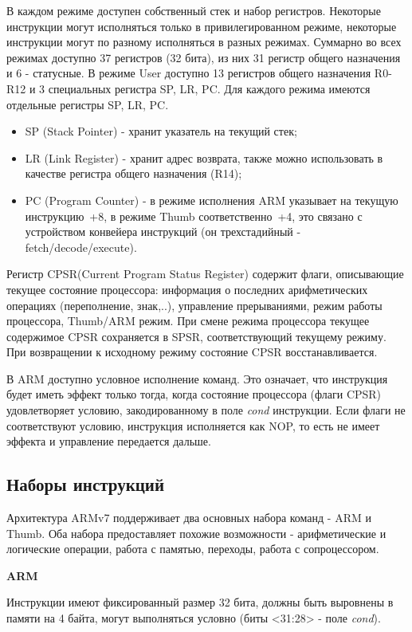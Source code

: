 В каждом режиме доступен собственный стек и набор регистров. Некоторые инструкции могут исполняться только в привилегированном режиме, некоторые инструкции могут по разному исполняться в разных режимах. Суммарно во всех режимах доступно 37 регистров (32 бита), из них 31 регистр общего назначения и 6 - статусные. В режиме User доступно 13 регистров общего назначения R0-R12 и 3 специальных регистра SP, LR, PC. Для каждого режима имеются отдельные регистры SP, LR, PC.

\begin{itemize}
    \item SP (Stack Pointer) - хранит указатель на текущий стек;
    \item LR (Link Register) - хранит адрес возврата, также можно использовать в качестве регистра общего назначения (R14);
    \item PC (Program Counter) - в режиме исполнения ARM указывает на текущую инструкцию~+8, в режиме Thumb соответственно~+4, это связано с устройством конвейера инструкций (он трехстадийный - fetch/decode/execute).
\end{itemize}

Регистр CPSR(Current Program Status Register) содержит флаги, описывающие текущее состояние процессора: информация о последних арифметических операциях (переполнение, знак,..), управление прерываниями, режим работы процессора, Thumb/ARM режим. При смене режима процессора текущее содержимое CPSR сохраняется в SPSR, соответствующий текущему режиму. При возвращении к исходному режиму состояние CPSR восстанавливается.

В ARM доступно условное исполнение команд. Это означает, что инструкция будет иметь эффект только тогда, когда состояние процессора (флаги CPSR) удовлетворяет условию, закодированному в поле {\it cond} инструкции. Если флаги не соответствуют условию, инструкция исполняется как NOP, то есть не имеет эффекта и управление передается дальше.

\subsection{Наборы инструкций}

Архитектура ARMv7 поддерживает два основных набора команд - ARM и Thumb. Оба набора предоставляет похожие возможности - арифметические и логические операции, работа с памятью, переходы, работа с сопроцессором.

\textbf{ARM}

Инструкции имеют фиксированный размер 32 бита, должны быть выровнены в памяти на 4 байта, могут выполняться условно (биты <31:28> - поле \textit{cond}).

